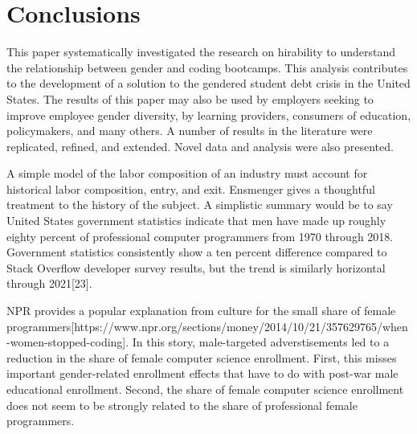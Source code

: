 \documentclass[review]{elsarticle}
\begin{document}
\section{Conclusions}

This paper systematically investigated the research on hirability to understand the relationship between gender and coding bootcamps.
This analysis contributes to the development of a solution to the gendered student debt crisis in the United States.
The results of this paper may also be used by employers seeking to improve employee gender diversity,
by learning providers,
consumers of education,
policymakers,
and many others.
A number of results in the literature were replicated, refined, and extended.
Novel data and analysis were also presented.

A simple model of the labor composition of an industry must account for historical labor composition,
entry, and exit.
Ensmenger gives a thoughtful treatment to the history of the subject\cite{ensmenger2010making}.
A simplistic summary would be to say United States government statistics indicate that men
have made up roughly eighty percent of professional computer programmers from 1970 through 2018.
Government statistics consistently show a ten percent difference compared to Stack Overflow developer survey results,
but the trend is similarly horizontal through 2021[23].

NPR provides a popular explanation from culture for the small share of female programmers[https://www.npr.org/sections/money/2014/10/21/357629765/when-women-stopped-coding].
In this story, male-targeted adverstisements led to a reduction in the share of female computer science enrollment.
First, this misses important gender-related enrollment effects that have to do with post-war male educational enrollment.
Second, the share of female computer science enrollment does not seem to be strongly related to the share of professional female programmers.
\end{document}
